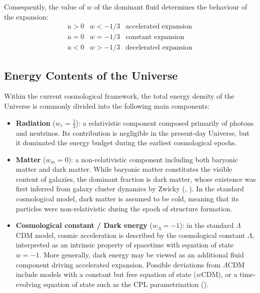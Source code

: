 Consequently, the value of $w$ of the dominant fluid determines the behaviour of the expansion:
\begin{equation}
    \begin{array}{lll}
    \ddot{a}>0 & w<-1/3 & \text{accelerated expansion} \\
    \ddot{a}=0 & w=-1/3 & \text{constant expansion} \\
    \ddot{a}<0 & w>-1/3 & \text{decelerated expansion}
    \end{array}
    \end{equation}

\subsection{Energy Contents of the Universe}

Within the current cosmological framework, the total energy density of the Universe is commonly divided into the following main components:
\begin{itemize}
    \item \textbf{Radiation} ($w_r = \frac{1}{3}$): a relativistic component composed primarily of photons and neutrinos. Its contribution is negligible in the present-day Universe, 
    but it dominated the energy budget during the earliest cosmological epochs.

    \item \textbf{Matter} ($w_m = 0$): a non-relativistic component including both baryonic matter and dark matter. While baryonic matter constitutes the visible content of galaxies, 
    the dominant fraction is dark matter, whose existence was first inferred from galaxy cluster dynamics by Zwicky (\cite{zwicky1933}, \cite{andernach2017}). In the standard cosmological model, dark matter is assumed to be cold, meaning that its particles were non-relativistic during the epoch of structure formation.

    \item \textbf{Cosmological constant / Dark energy} ($w_{\Lambda} = -1$): in the standard $\Lambda$CDM model, cosmic acceleration is described by the cosmological constant $\Lambda$, 
    interpreted as an intrinsic property of spacetime with equation of state $w=-1$. More generally, dark energy may be viewed as an additional fluid component 
    driving accelerated expansion. Possible deviations from $\Lambda$CDM include models with a constant but free equation of state ($w$CDM), or a time-evolving 
    equation of state such as the CPL parametrization (\cite{Chevallier_2001}).
\end{itemize}

